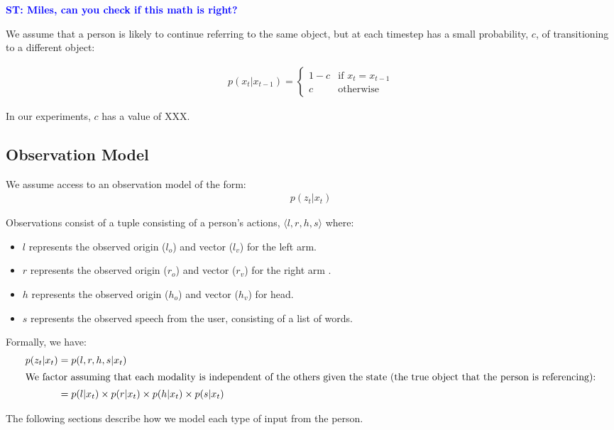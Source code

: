 \documentclass[letterpaper, 10 pt, conference]{ieeeconf}
\newcommand{\stnote}[1]{\textcolor{Blue}{\textbf{ST: #1}}}
\begin{document}
\stnote{Miles, can you check if this math is right?}

We assume that a person is likely to continue referring to the same
object, but at each timestep has a small probability, $c$, of
transitioning to a different object: 

\begin{align}
p(x_t | x_{t-1}) = \left\{  \begin{array}{ll}
1-c &\mbox{if } x_t = x_{t-1}\\
c &\mbox{otherwise}
\end{array}\right.
\end{align}

In our experiments, $c$ has a value of XXX.


\subsection{Observation Model}

We assume access to an observation model of the form:
\begin{align}
p(z_t | x_t)
\end{align}

Observations consist of a tuple consisting of a person's actions,
$\langle l, r, h, s\rangle $ where:
\begin{itemize}
	\item $l$ represents the observed origin ($l_o$) and vector ($l_v$) for the left arm.
	\item $r$ represents the observed origin  ($r_o$) and vector ($r_v$)  for the right arm .
	\item $h$ represents the observed origin  ($h_o$) and vector ($h_v$)  for head.
	\item $s$ represents the observed speech from the user, consisting of a list of words.
	\end{itemize}

Formally, we have:
\begin{align}
p(z_t | x_t) &= p(l, r, h, s | x_t)\\
\intertext{We factor assuming that each modality is independent of the others given the state (the true object that the person is referencing):}
&= p(l | x_t) \times p(r | x_t) \times p(h | x_t) \times p(s | x_t)
\end{align}

\noindent The following sections describe how we model each type of
input from the person.
\end{document}
